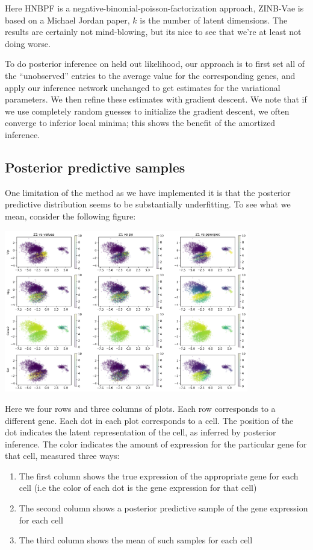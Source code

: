 Here HNBPF is a negative-binomial-poisson-factorization approach, ZINB-Vae is based on a Michael Jordan paper, $k$ is the number of latent dimensions.  The results are certainly not mind-blowing, but its nice to see that we're at least not doing worse.  

To do posterior inference on held out likelihood, our approach is to first set all of the ``unobserved'' entries to the average value for the corresponding genes, and apply our inference network unchanged to get estimates for the variational parameters.  We then refine these estimates with gradient descent.  We note that if we use completely random guesses to initialize the gradient descent, we often converge to inferior local minima; this shows the benefit of the amortized inference.  

\subsection{Posterior predictive samples}

One limitation of the method as we have implemented it is that the posterior predictive distribution seems to be substantially underfitting.  To see what we mean, consider the following figure:

\includegraphics[width=0.8\textwidth]{pics/Z1gn}

Here we four rows and three columns of plots.  Each row corresponds to a different gene.  Each dot in each plot corresponds to a cell.  The position of the dot indicates the latent representation of the cell, as inferred by posterior inference.  The color indicates the amount of expression for the particular gene for that cell, measured three ways:

\begin{enumerate}
\item The first column shows the true expression of the appropriate gene for each cell (i.e the color of each dot is the gene expression for that cell)
\item The second column shows a posterior predictive sample of the gene expression for each cell
\item The third column shows the mean of such samples for each cell
\end{enumerate}

